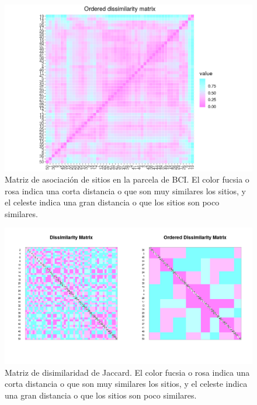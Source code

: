 \documentclass[11pt,]{article}
\begin{document}
\begin{figure}
\centering
\includegraphics[width=1.00000\textwidth]{matriz de disimilaridad ordenada.png}
\caption{Matriz de asociación de sitios en la parcela de BCI. El color
fucsia o rosa indica una corta distancia o que son muy similares los
sitios, y el celeste indica una gran distancia o que los sitios son poco
similares.\label{fig:matrizdisimord}}
\end{figure}

\begin{figure}
\centering
\includegraphics[width=1.00000\textwidth]{matriz de disimilaridad de jaccard.png}
\caption{Matriz de disimilaridad de Jaccard. El color fucsia o rosa
indica una corta distancia o que son muy similares los sitios, y el
celeste indica una gran distancia o que los sitios son poco
similares.\label{fig:matrizjacc}}
\end{figure}
\end{document}
